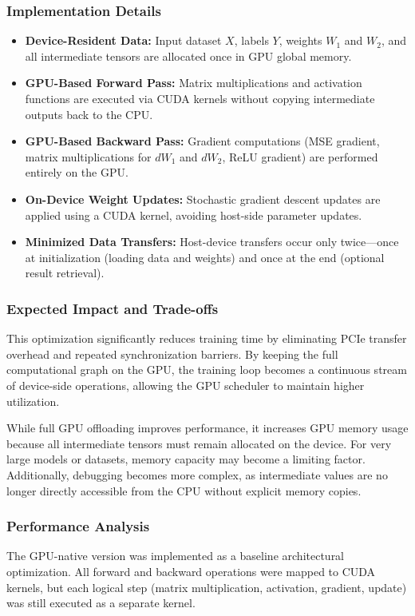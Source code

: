 \documentclass[conference, 12pt]{IEEEtran}
\begin{document}
\subsubsection{Implementation Details}
\begin{itemize}
    \item \textbf{Device-Resident Data:} Input dataset $X$, labels $Y$, weights $W_1$ and $W_2$, and all intermediate tensors are allocated once in GPU global memory.
    
    \item \textbf{GPU-Based Forward Pass:} Matrix multiplications and activation functions are executed via CUDA kernels without copying intermediate outputs back to the CPU.
    
    \item \textbf{GPU-Based Backward Pass:} Gradient computations (MSE gradient, matrix multiplications for $dW_1$ and $dW_2$, ReLU gradient) are performed entirely on the GPU.
    
    \item \textbf{On-Device Weight Updates:} Stochastic gradient descent updates are applied using a CUDA kernel, avoiding host-side parameter updates.
    
    \item \textbf{Minimized Data Transfers:} Host-device transfers occur only twice—once at initialization (loading data and weights) and once at the end (optional result retrieval).
\end{itemize}

\subsubsection{Expected Impact and Trade-offs}
This optimization significantly reduces training time by eliminating PCIe transfer overhead and repeated synchronization barriers. By keeping the full computational graph on the GPU, the training loop becomes a continuous stream of device-side operations, allowing the GPU scheduler to maintain higher utilization.

While full GPU offloading improves performance, it increases GPU memory usage because all intermediate tensors must remain allocated on the device. For very large models or datasets, memory capacity may become a limiting factor. Additionally, debugging becomes more complex, as intermediate values are no longer directly accessible from the CPU without explicit memory copies.

\subsubsection{Performance Analysis}
The GPU-native version was implemented as a baseline architectural optimization. All forward and backward operations were mapped to CUDA kernels, but each logical step (matrix multiplication, activation, gradient, update) was still executed as a separate kernel.
\end{document}
